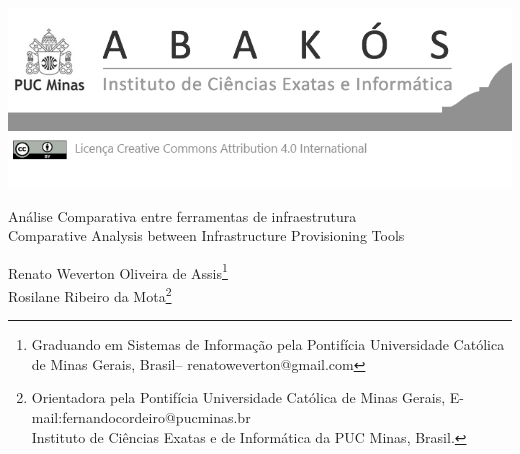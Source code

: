 \documentclass[a4paper,12pt,Times]{article}
\makeatletter
\newcommand{\monog}{Análise Comparativa entre ferramentas de infraestrutura}
\newcommand{\monogES}{Comparative Analysis between Infrastructure Provisioning Tools}
\newcommand{\origem}{Brasil}
\newcommand{\AutorA}{Renato Weverton Oliveira de Assis}
\newcommand{\funcaoA}{Graduando em Sistemas de Informação pela}
\newcommand{\emailA}{renatoweverton@gmail.com}
\newcommand{\cursA}{ Pontifícia Universidade Católica de Minas Gerais}
\newcommand{\AutorB}{Rosilane Ribeiro da Mota}
\newcommand{\funcaoB}{Orientadora pela Pontifícia Universidade Católica de Minas Gerais}
\newcommand{\emailB}{fernandocordeiro@pucminas.br}
\newcommand{\cursB}{Instituto de Ciências Exatas e de Informática da PUC Minas}
\newcommand{\keyword}[1]{\textsf{#1}}
\makeatother
\begin{document}

\begin{flushleft}

\begin{minipage} [c][5cm][b]{16.5cm} %
\includegraphics[scale=1.1]{figuras/pucmg.png} 
\end{minipage}

 \vspace{0cm} {
 \singlespacing \Large{\monog {} \\ }
  \normalsize{\monogES}
 }
\end{flushleft}
\begin{flushright}
\singlespacing 
\normalsize{\AutorA \footnote{\funcaoA \cursA, \origem -- \emailA }} \\
\normalsize{\AutorB \footnote{\funcaoB, E-mail:\emailB \\ \cursB, \origem. }} \\
\end{flushright}
\thispagestyle{empty}

\begin{abstract}
\noindent
   Infraestrutura como código, ou também conhecido como IaC é o gerenciamento de recursos em um ambiente computacional. Este gerenciamento é dado por meio de linguagens declarativas para definir e implantar recursos, utilizando \textit{softwares} específicos para essa finalidade. A infraestrutura como código é adotada primordialmente na computação em nuvem permitindo um fluxo de trabalho totalmente automatizado. 
    Este trabalho trata-se de uma análise de ferramentas de provisionamento e gerenciamento de configuração.  
\\\textbf{\keyword{Palavras-chave: }}  Infraestrutura como código,Automação, Provisionamento,  Gerenciamento de configuração, Computação na nuvem Terraform, Cheff 
\end{abstract}
\end{document}

